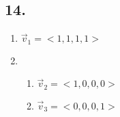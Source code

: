 \documentclass{article}
\begin{document}
\subsection{14.}
\begin{enumerate}[label=\textbf{\alph*.}]
	\item $ \vec{v}_1 = <1, 1, 1, 1> $
	\item
		\begin{enumerate}[label=\textbf{\arabic*.}]
			\item $ \vec{v}_2 = <1, 0, 0, 0> $
			\item $ \vec{v}_3 = <0, 0, 0, 1> $
		\end{enumerate}
\end{enumerate}
\end{document}
